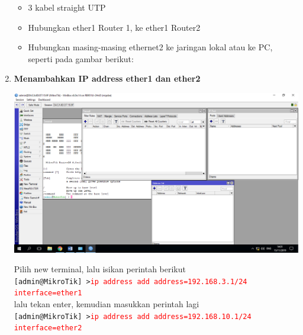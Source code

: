 \documentclass[a4paper,12pt]{article}
\begin{document}
\begin{enumerate}
\begin{itemize}
		\item 3 kabel  straight UTP
		
		\item Hubungkan ether1 Router 1, ke ether1 Router2
		
		\item Hubungkan masing-masing ethernet2 ke jaringan lokal atau ke PC, seperti pada gambar berikut:
		
	\end{itemize}

	\item \textbf{Menambahkan IP address ether1 dan ether2}
	\begin{center}
		\includegraphics[scale=.4]{Page-1-Image-2}
	\end{center}
	Pilih new terminal, lalu isikan perintah berikut\\
	\texttt{[admin@MikroTik] >\textcolor{red} {ip address add address=192.168.3.1/24 interface=ether1}}\\
	lalu tekan enter, kemudian masukkan perintah lagi\\
	\texttt{[admin@MikroTik] >\textcolor{red} {ip address add address=192.168.10.1/24 interface=ether2}}\\
	

\end{enumerate}
\end{document}
